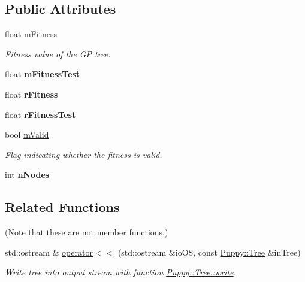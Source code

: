\subsection*{Public Attributes}
\begin{DoxyCompactItemize}
\item 
\hypertarget{classPuppy_1_1Tree_a570b092e1827472f39dba11df2bfdbca}{}float \hyperlink{classPuppy_1_1Tree_a570b092e1827472f39dba11df2bfdbca}{m\+Fitness}\label{classPuppy_1_1Tree_a570b092e1827472f39dba11df2bfdbca}

\begin{DoxyCompactList}\small\item\em Fitness value of the G\+P tree. \end{DoxyCompactList}\item 
\hypertarget{classPuppy_1_1Tree_ad110a4c393135da8fd0eb603ac671f10}{}float {\bfseries m\+Fitness\+Test}\label{classPuppy_1_1Tree_ad110a4c393135da8fd0eb603ac671f10}

\item 
\hypertarget{classPuppy_1_1Tree_aafd16788f30f4f5474e19899edc848e4}{}float {\bfseries r\+Fitness}\label{classPuppy_1_1Tree_aafd16788f30f4f5474e19899edc848e4}

\item 
\hypertarget{classPuppy_1_1Tree_a3f8ddcf28b4ea6b1461839d131244b00}{}float {\bfseries r\+Fitness\+Test}\label{classPuppy_1_1Tree_a3f8ddcf28b4ea6b1461839d131244b00}

\item 
\hypertarget{classPuppy_1_1Tree_a3acb505d5915892a986b4a5ee0eb1e87}{}bool \hyperlink{classPuppy_1_1Tree_a3acb505d5915892a986b4a5ee0eb1e87}{m\+Valid}\label{classPuppy_1_1Tree_a3acb505d5915892a986b4a5ee0eb1e87}

\begin{DoxyCompactList}\small\item\em Flag indicating whether the fitness is valid. \end{DoxyCompactList}\item 
\hypertarget{classPuppy_1_1Tree_a31d5ff402f9d01fbd4043507e4abd8c9}{}int {\bfseries n\+Nodes}\label{classPuppy_1_1Tree_a31d5ff402f9d01fbd4043507e4abd8c9}

\end{DoxyCompactItemize}
\subsection*{Related Functions}
(Note that these are not member functions.) \begin{DoxyCompactItemize}
\item 
std\+::ostream \& \hyperlink{group__Puppy_ga055f36ab366f6ac84c28e0f7f19103e2}{operator$<$$<$} (std\+::ostream \&io\+O\+S, const \hyperlink{classPuppy_1_1Tree}{Puppy\+::\+Tree} \&in\+Tree)
\begin{DoxyCompactList}\small\item\em Write tree into output stream with function \hyperlink{classPuppy_1_1Tree_ae7cf5b8e64273dc265a2e751f4a06ffb}{Puppy\+::\+Tree\+::write}. \end{DoxyCompactList}\end{DoxyCompactItemize}


